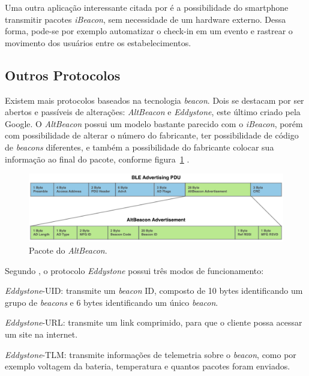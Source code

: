 \documentclass[
		12pt,				%
		openright,			%
		oneside,			%
		a4paper,			%
		chapter=TITLE,		%
		english,			%
		brazil				%
	]{abntex2}
\begin{document}
Uma outra aplicação interessante citada por  é a possibilidade do smartphone transmitir pacotes \textit{iBeacon}, sem necessidade de um hardware externo. Dessa forma, pode-se por exemplo automatizar o check-in em um evento e rastrear o movimento dos usuários entre os estabelecimentos.

\subsection{Outros Protocolos}\label{sec:outros-protocolos}

Existem mais protocolos baseados na tecnologia \textit{beacon}. Dois se destacam por ser abertos e passíveis de alterações: \textit{AltBeacon} e \textit{Eddystone}, este último criado pela Google. O \textit{AltBeacon} possui um modelo bastante parecido com o \textit{iBeacon}, porém com possibilidade de alterar o número do fabricante, ter possibilidade de código de \textit{beacons} diferentes, e também a possibilidade do fabricante colocar sua informação ao final do pacote, conforme figura~\ref{fig:altbeacon-packet} \cite{arm-beacons}.

\begin{figure}[htb]
	\caption{\label{fig:altbeacon-packet}Pacote do \textit{AltBeacon}.}
	\begin{center}
		\includegraphics[width=1\textwidth]{img/altbeacon-packet.png}
	\end{center}
\end{figure}

Segundo , o protocolo \textit{Eddystone} possui três modos de funcionamento:
\begin{alineas}
	\item \textit{Eddystone}-UID: transmite um \textit{beacon} ID, composto de 10 bytes identificando um grupo de \textit{beacons} e  6 bytes identificando um único \textit{beacon}.
	\item \textit{Eddystone}-URL: transmite um link comprimido, para que o cliente possa acessar um site na internet.
	\item \textit{Eddystone}-TLM: transmite informações de telemetria sobre o \textit{beacon}, como por exemplo voltagem da bateria, temperatura e quantos pacotes foram enviados.
\end{alineas}
\end{document}
